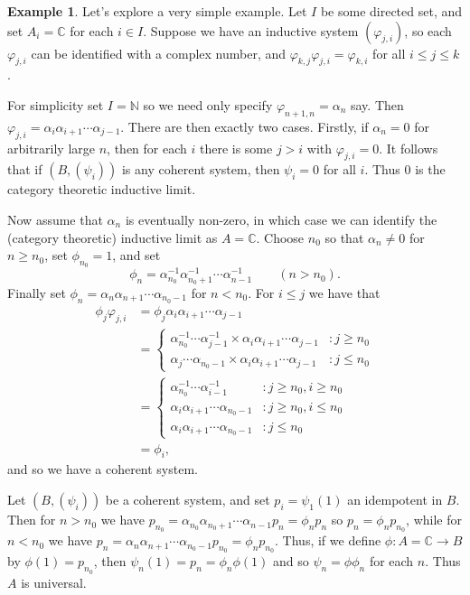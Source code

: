 \documentclass[a4paper,11pt]{article}
\theoremstyle{definition}
\newtheorem{example}[lemma]{Example}
\begin{document}
\begin{example}
Let's explore a very simple example.  Let $I$ be some directed set, and set $A_i=\mathbb C$ for each
$i\in I$.  Suppose we have an inductive system $(\varphi_{j,i})$, so each $\varphi_{j,i}$ can be
identified with a complex number, and $\varphi_{k,j}\varphi_{j,i}=\varphi_{k,i}$ for all $i\leq j
\leq k$.

For simplicity set $I=\mathbb N$ so we need only specify $\varphi_{n+1,n} = \alpha_n$ say.  Then
$\varphi_{j,i} = \alpha_i \alpha_{i+1}\cdots\alpha_{j-1}$.  There are then exactly two cases.
Firstly, if $\alpha_n=0$ for arbitrarily large $n$, then for each $i$ there is some $j>i$ with
$\varphi_{j,i}=0$.  It follows that if $(B,(\psi_i))$ is any coherent system, then $\psi_i=0$
for all $i$.  Thus $0$ is the category theoretic inductive limit.

Now assume that $\alpha_n$ is eventually non-zero, in which case we can identify the (category
theoretic) inductive limit as $A=\mathbb C$.  Choose $n_0$ so that $\alpha_n\not=0$ for $n\geq n_0$,
set $\phi_{n_0} = 1$, and set
\[ \phi_n = \alpha_{n_0}^{-1} \alpha_{n_0+1}^{-1} \cdots \alpha_{n-1}^{-1} \qquad (n>n_0). \]
Finally set $\phi_n  = \alpha_n \alpha_{n+1} \cdots \alpha_{n_0-1}$ for $n<n_0$.  For $i\leq j$
we have that
\begin{align*}
\phi_j \varphi_{j,i} &= \phi_j \alpha_i \alpha_{i+1} \cdots \alpha_{j-1} \\
&= \begin{cases} 
\alpha_{n_0}^{-1} \cdots \alpha_{j-1}^{-1} \times \alpha_i \alpha_{i+1} \cdots \alpha_{j-1}
&: j\geq n_0 \\
\alpha_j \cdots \alpha_{n_0-1} \times \alpha_i \alpha_{i+1} \cdots \alpha_{j-1}
&: j\leq n_0
\end{cases} \\
&= \begin{cases} 
\alpha_{n_0}^{-1} \cdots \alpha_{i-1}^{-1} &: j\geq n_0, i\geq n_0 \\
\alpha_i \alpha_{i+1} \cdots \alpha_{n_0-1} &: j\geq n_0, i\leq n_0 \\
\alpha_i \alpha_{i+1} \cdots \alpha_{n_0-1} &: j\leq n_0
\end{cases} \\
&= \phi_i,
\end{align*}
and so we have a coherent system.

Let $(B,(\psi_i))$ be a coherent system, and set $p_i = \psi_1(1)$ an idempotent in $B$.  Then
for $n>n_0$ we have $p_{n_0} = \alpha_{n_0} \alpha_{n_0+1} \cdots \alpha_{n-1} p_n = \phi_n p_n$
so $p_n = \phi_n p_{n_0}$, while for $n<n_0$ we have $p_n = \alpha_n \alpha_{n+1} \cdots
\alpha_{n_0-1} p_{n_0} = \phi_n p_{n_0}$.  Thus, if we define $\phi:A=\mathbb C\rightarrow B$ by
$\phi(1) = p_{n_0}$, then $\psi_n(1) = p_n = \phi_n \phi(1)$ and so $\psi_n = \phi \phi_n$ for each
$n$.  Thus $A$ is universal.
\end{example}
\end{document}
